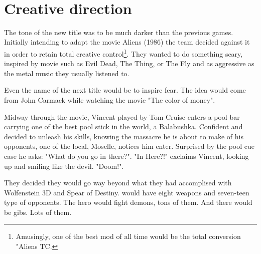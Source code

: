 \\
\par
{}

\section{Creative direction}
The tone of the new title was to be much darker than the previous games. Initially intending to adapt the movie Aliens (1986) the team decided against it in order to retain total creative control\footnote{Amusingly, one of the best mod of all time would be the total conversion "Aliens TC.}. They wanted to do something scary, inspired by movie such as Evil Dead, The Thing, or The Fly and as aggressive as the metal music they usually listened to.\\
\par
Even the name of the next title would be to inspire fear. The idea would come from John Carmack while watching the movie "The color of money".\\ 
\par
Midway through the movie, Vincent played by Tom Cruise enters a pool bar carrying one of the best pool stick in the world, a Balabushka. Confident and decided to unleash his skills, knowing the massacre he is about to make of his opponents, one of the local, Moselle, notices him enter. Surprised by the pool cue case he asks: "What do you go in there?". "In Here?!" exclaims Vincent, looking up and smiling like the devil. "Doom!".\\
\par

\par
{}
\par
They decided they would go way beyond what they had accomplised with Wolfenstein 3D and Spear of Destiny. \doom would have eight weapons and seven-teen type of opponents. The hero would fight demons, tons of them. And there would be gibs. Lots of them.

